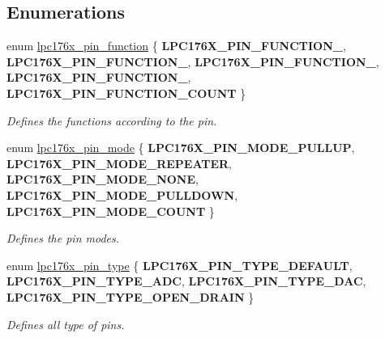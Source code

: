 \subsection*{Enumerations}
\begin{DoxyCompactItemize}
\item 
enum \mbox{\hyperlink{io-defs_8h_a93321e597449441e81f45118a89a304e}{lpc176x\+\_\+pin\+\_\+function}} \{ \newline
{\bfseries L\+P\+C176\+X\+\_\+\+P\+I\+N\+\_\+\+F\+U\+N\+C\+T\+I\+O\+N\+\_}, 
{\bfseries L\+P\+C176\+X\+\_\+\+P\+I\+N\+\_\+\+F\+U\+N\+C\+T\+I\+O\+N\+\_}, 
{\bfseries L\+P\+C176\+X\+\_\+\+P\+I\+N\+\_\+\+F\+U\+N\+C\+T\+I\+O\+N\+\_}, 
{\bfseries L\+P\+C176\+X\+\_\+\+P\+I\+N\+\_\+\+F\+U\+N\+C\+T\+I\+O\+N\+\_}, 
\newline
{\bfseries L\+P\+C176\+X\+\_\+\+P\+I\+N\+\_\+\+F\+U\+N\+C\+T\+I\+O\+N\+\_\+\+C\+O\+U\+NT}
 \}
\begin{DoxyCompactList}\small\item\em Defines the functions according to the pin. \end{DoxyCompactList}\item 
enum \mbox{\hyperlink{io-defs_8h_a9390c5b28191c22aaca678d89b1189ec}{lpc176x\+\_\+pin\+\_\+mode}} \{ \newline
{\bfseries L\+P\+C176\+X\+\_\+\+P\+I\+N\+\_\+\+M\+O\+D\+E\+\_\+\+P\+U\+L\+L\+UP}, 
{\bfseries L\+P\+C176\+X\+\_\+\+P\+I\+N\+\_\+\+M\+O\+D\+E\+\_\+\+R\+E\+P\+E\+A\+T\+ER}, 
{\bfseries L\+P\+C176\+X\+\_\+\+P\+I\+N\+\_\+\+M\+O\+D\+E\+\_\+\+N\+O\+NE}, 
{\bfseries L\+P\+C176\+X\+\_\+\+P\+I\+N\+\_\+\+M\+O\+D\+E\+\_\+\+P\+U\+L\+L\+D\+O\+WN}, 
\newline
{\bfseries L\+P\+C176\+X\+\_\+\+P\+I\+N\+\_\+\+M\+O\+D\+E\+\_\+\+C\+O\+U\+NT}
 \}
\begin{DoxyCompactList}\small\item\em Defines the pin modes. \end{DoxyCompactList}\item 
enum \mbox{\hyperlink{io-defs_8h_a7591f1cf553f174941b6ebaeb85d5970}{lpc176x\+\_\+pin\+\_\+type}} \{ {\bfseries L\+P\+C176\+X\+\_\+\+P\+I\+N\+\_\+\+T\+Y\+P\+E\+\_\+\+D\+E\+F\+A\+U\+LT}, 
{\bfseries L\+P\+C176\+X\+\_\+\+P\+I\+N\+\_\+\+T\+Y\+P\+E\+\_\+\+A\+DC}, 
{\bfseries L\+P\+C176\+X\+\_\+\+P\+I\+N\+\_\+\+T\+Y\+P\+E\+\_\+\+D\+AC}, 
{\bfseries L\+P\+C176\+X\+\_\+\+P\+I\+N\+\_\+\+T\+Y\+P\+E\+\_\+\+O\+P\+E\+N\+\_\+\+D\+R\+A\+IN}
 \}
\begin{DoxyCompactList}\small\item\em Defines all type of pins. \end{DoxyCompactList}\item 

\end{DoxyCompactItemize}
